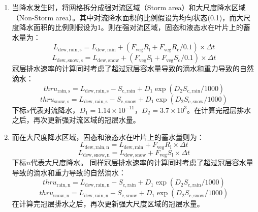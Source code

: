 \begin{enumerate}
  \item 当降水发生时，将网格拆分成强对流区域（Storm area）和大尺度降水区域（Non-Storm area）。其中对流降水面积的比例假设为均匀状态(0.1)，而大尺度降水面积的比例则假设为1。则在强对流区域，固态和液态水在叶片上的蓄水量为：
    \begin{equation}
      L_{\mathrm{dew,rain,s}}=L_{\mathrm{dew,rain}}+(F_{\mathrm{veg}}R_{\mathrm{l}}+F_{\mathrm{veg}}R_{\mathrm{c}}/0.1)\times \Delta{t}
    \end{equation}
    \begin{equation}
      L_{\mathrm{dew,snow,s}}=L_{\mathrm{dew,snow}}+(F_{\mathrm{veg}}S_{\mathrm{l}}+F_{\mathrm{veg}}S_{\mathrm{c}}/0.1)\times \Delta{t}
    \end{equation}
    冠层排水速率的计算同时考虑了超过冠层容水量导致的滴水和重力导致的自然滴水：
    \begin{equation}
      thru_{\mathrm{rain,s}}=L_{\mathrm{dew,rain,s}}-S_{\mathrm{c,rain}}+D_{1} \exp \left(D_{2} S_{\mathrm{c,rain}}/1000\right)
    \end{equation}
    \begin{equation}
      thru_{\mathrm{snow,s}}=L_{\mathrm{dew,rain,s}}-S_{\mathrm{c,snow}}+D_{1} \exp \left(D_{2} S_{\mathrm{c,snow}}/1000\right)
    \end{equation}
    下标$s$代表对流降水，$D_{1}=1.14 \times 10^{-11}$，$D_{2}=3.7 \times 10^{3}$。在计算完冠层排水之后，再次更新强对流区域的冠层水量。

  \item 而在大尺度降水区域，固态和液态水在叶片上的蓄水量则为：
    \begin{equation}
      L_{\mathrm{dew,rain,n}}=L_{\mathrm{dew,rain}}+F_{\mathrm{veg}}R_{\mathrm{l}}\times \Delta{t}
    \end{equation}
    \begin{equation}
      L_{\mathrm{dew,snow,n}}=L_{\mathrm{dew,snow}}+F_{\mathrm{veg}}S_{\mathrm{l}} \times \Delta{t}
    \end{equation}
    下标$n$代表大尺度降水。
    同样冠层排水速率的计算同时考虑了超过冠层容水量导致的滴水和重力导致的自然滴水：
    \begin{equation}
      thru_{\mathrm{rain,n}}=L_{\mathrm{dew,rain,n}}-S_{\mathrm{c,rain}}+D_{1} \exp \left(D_{2} S_{\mathrm{c,rain}}/1000\right)
    \end{equation}
    \begin{equation}
      thru_{\mathrm{snow,n}}=L_{\mathrm{dew,rain,n}}-S_{\mathrm{c,snow}}+D_{1} \exp \left(D_{2} S_{\mathrm{c,snow}}/1000\right)
    \end{equation}
    在计算完冠层排水之后，再次更新强大尺度区域的冠层水量。


\end{enumerate}
